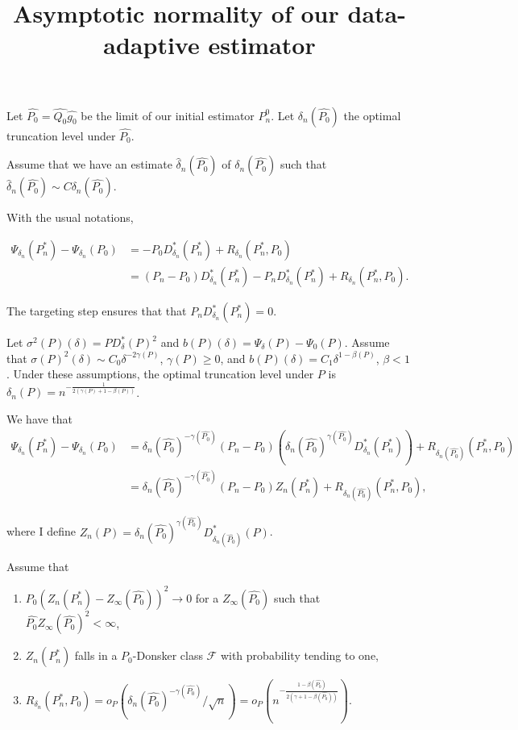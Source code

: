 \documentclass[a4paper]{article}
\title{Asymptotic normality of our data-adaptive estimator}
\begin{document}
\maketitle
Let $\hat{P_0} = \hat{Q_0} \hat{g_0}$ be the limit of our initial estimator $P^0_n$. Let $\delta_n(\hat{P_0})$ the optimal truncation level under $\hat{P_0}$.

Assume that we have an estimate $\hat{\delta}_n(\hat{P_0})$ of $\delta_n(\hat{P_0})$ such that $\hat{\delta}_n(\hat{P_0}) \sim C \delta_n(\hat{P_0})$.

With the usual notations,

\begin{align*}
\Psi_{\delta_n}(P_n^*) - \Psi_{\delta_n}(P_0) &= - P_0 D_{\delta_n}^*(P_n^*) + R_{\delta_n}(P_n^*, P_0)\\
&= (P_n - P_0) D_{\delta_n}^*(P_n^*) - P_n D_{\delta_n}^*(P_n^*) + R_{\delta_n}(P_n^*, P_0).
\end{align*}

The targeting step ensures that that $P_n D_{\delta_n}^*(P_n^*) = 0$.

\medskip

Let $\sigma^2(P)(\delta) = P D_\delta^*(P)^2$ and $b(P)(\delta) = \Psi_{\delta}(P) - \Psi_0(P)$. Assume that $\sigma(P)^2(\delta) \sim C_0 \delta^{-2\gamma(P)}$, $\gamma(P) \geq 0$, and $b(P)(\delta) = C_1 \delta^{1 - \beta(P)}$, $\beta < 1$. Under these assumptions, the optimal truncation level under $P$ is $\delta_n(P) = n^{-\frac{1}{2(\gamma(P) + 1 - \beta(P))}}$.

\medskip

We have that
\begin{align*}
\Psi_{\delta_n}(P_n^*) - \Psi_{\delta_n}(P_0) &= \delta_n(\hat{P_0})^{-\gamma(\hat{P_0})}(P_n - P_0) (\delta_n(\hat{P_0})^{\gamma(\hat{P_0})}  D_{\delta_n}^*(P_n^*)) + R_{\delta_n(\hat{P_0})}(P_n^*, P_0)\\
& = \delta_n(\hat{P_0})^{-\gamma(\hat{P_0})}(P_n - P_0) Z_n(P_n^*) + R_{\delta_n(\hat{P_0})}(P_n^*, P_0),
\end{align*}

where I define $Z_n(P) = \delta_n(\hat{P_0})^{\gamma(\hat{P_0})} D_{\delta_n(\hat{P_0})}^*(P)$.

\medskip

Assume that 
\begin{enumerate}
\item $P_0 \left(Z_n(P_n^*) - Z_\infty(\hat{P_0})\right)^2 \rightarrow 0$ for a $Z_\infty(\hat{P_0})$ such that $\hat{P_0} Z_\infty(\hat{P_0})^2 < \infty$,
\item $Z_n(P_n^*)$ falls in a $P_0$-Donsker class $\mathcal{F}$ with probability tending to one,
\item $R_{\delta_n}(P_n^*, P_0) = o_P(\delta_n(\hat{P_0})^{-\gamma(\hat{P_0})} / \sqrt{n}) =  o_P\left(n^{-\frac{1 - \beta(\hat{P_0})}{2 (\gamma + 1 - \beta(\hat{P_0}))}}\right)$.
\end{enumerate}
\end{document}
